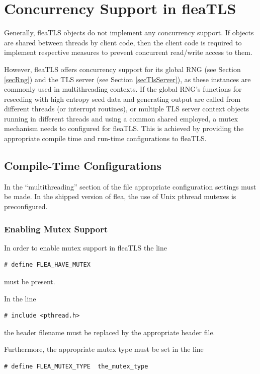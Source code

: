 \documentclass[a4paper,11pt]{scrartcl}
\begin{document}
\section{Concurrency Support in fleaTLS}

\label{secConcurrency}
Generally, fleaTLS objects do not implement any concurrency support. If  
objects are shared between threads by client code, then the client code is
required to implement respective measures to prevent concurrent read/write
access to them.

However, fleaTLS offers concurrency support for its global RNG (see Section \ref{secRng})
and the TLS server (see Section \ref{secTlsServer}), as these instances are
commonly used in multithreading contexts. If the global RNG's
functions for reseeding with high entropy seed data and generating output are
called from different threads (or interrupt routines), or multiple TLS
server context objects running in different threads and using a common shared
 employed, a mutex mechanism needs
to configured for fleaTLS. This is achieved by providing the appropriate compile
time and run-time configurations to fleaTLS.

\subsection{Compile-Time Configurations}

In the ``multithreading'' section of the file  
appropriate configuration settings must be made. In the shipped version of flea,
the use of Unix pthread mutexes is preconfigured. 

\subsubsection{Enabling Mutex Support}
In order to enable mutex support in fleaTLS the line 

\begin{verbatim}
# define FLEA_HAVE_MUTEX
\end{verbatim}
must be present.

In the line
\begin{verbatim}
# include <pthread.h>
\end{verbatim}
the header filename must be replaced by the appropriate header file.

Furthermore, the appropriate mutex type must be set in the line 
\begin{verbatim}
# define FLEA_MUTEX_TYPE  the_mutex_type
\end{verbatim}
\end{document}
